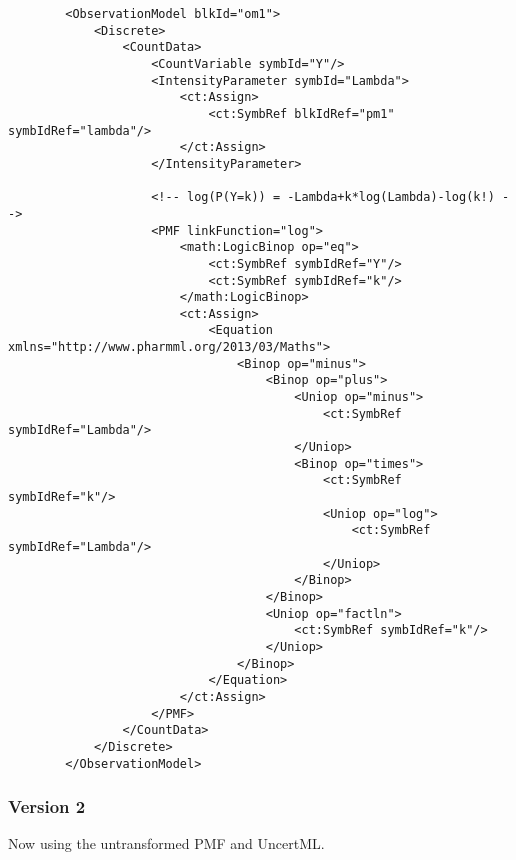 \lstset{language=XML}
\begin{lstlisting}				
        <ObservationModel blkId="om1">
            <Discrete>
                <CountData>
                    <CountVariable symbId="Y"/>
                    <IntensityParameter symbId="Lambda">
                        <ct:Assign>
                            <ct:SymbRef blkIdRef="pm1" symbIdRef="lambda"/>
                        </ct:Assign>
                    </IntensityParameter>
                    
                    <!-- log(P(Y=k)) = -Lambda+k*log(Lambda)-log(k!) -->
                    <PMF linkFunction="log">
                        <math:LogicBinop op="eq">
                            <ct:SymbRef symbIdRef="Y"/>
                            <ct:SymbRef symbIdRef="k"/>
                        </math:LogicBinop>
                        <ct:Assign>
                            <Equation xmlns="http://www.pharmml.org/2013/03/Maths">
                                <Binop op="minus">
                                    <Binop op="plus">
                                        <Uniop op="minus">
                                            <ct:SymbRef symbIdRef="Lambda"/>
                                        </Uniop>
                                        <Binop op="times">
                                            <ct:SymbRef symbIdRef="k"/>
                                            <Uniop op="log">
                                                <ct:SymbRef symbIdRef="Lambda"/>
                                            </Uniop>
                                        </Binop>
                                    </Binop>
                                    <Uniop op="factln">
                                        <ct:SymbRef symbIdRef="k"/>
                                    </Uniop>
                                </Binop>
                            </Equation>
                        </ct:Assign>
                    </PMF>
                </CountData>
            </Discrete>
        </ObservationModel>
\end{lstlisting}

\subsubsection{Version 2}
Now using the untransformed PMF and UncertML.

